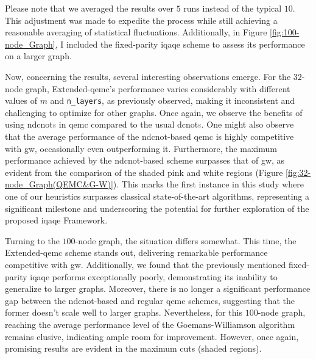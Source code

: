 Please note that we averaged the results over $5$ runs instead of the typical $10$. This adjustment was made to expedite the process while still achieving a reasonable averaging of statistical fluctuations. Additionally, in Figure \ref{fig:100-node_Graph}, I included the fixed-parity \acrshort{iqaqe} scheme to assess its performance on a larger graph.

Now, concerning the results, several interesting observations emerge. For the $32$-node graph, Extended-\acrshort{qemc}'s performance varies considerably with different values of $m$ and \texttt{n\_layers}, as previously observed, making it inconsistent and challenging to optimize for other graphs. Once again, we observe the benefits of using \acrshort{ndcnot}\textcolor{gray}{s} in \acrshort{qemc} compared to the usual \acrshort{dcnot}\textcolor{gray}{s}. One might also observe that the average performance of the \acrshort{ndcnot}-based \acrshort{qemc} is highly competitive with \acrshort{gw}, occasionally even outperforming it. Furthermore, the maximum performance achieved by the \acrshort{ndcnot}-based scheme surpasses that of \acrshort{gw}, as evident from the comparison of the shaded pink and white regions (Figure \ref{fig:32-node_Graph(QEMC&G-W)}). This marks the first instance in this study where one of our heuristics surpasses classical state-of-the-art algorithms, representing a significant milestone and underscoring the potential for further exploration of the proposed \acrshort{iqaqe} Framework.



Turning to the $100$-node graph, the situation differs somewhat. This time, the Extended-\acrshort{qemc} scheme stands out, delivering remarkable performance competitive with \acrshort{gw}. Additionally, we found that the previously mentioned fixed-parity \acrshort{iqaqe} performs exceptionally poorly, demonstrating its inability to generalize to larger graphs. Moreover, there is no longer a significant performance gap between the \acrshort{ndcnot}-based and regular \acrshort{qemc} schemes, suggesting that the former doesn't scale well to larger graphs. Nevertheless, for this $100$-node graph, reaching the average performance level of the Goemans-Williamson algorithm remains elusive, indicating ample room for improvement. However, once again, promising results are evident in the maximum cuts (shaded regions).

